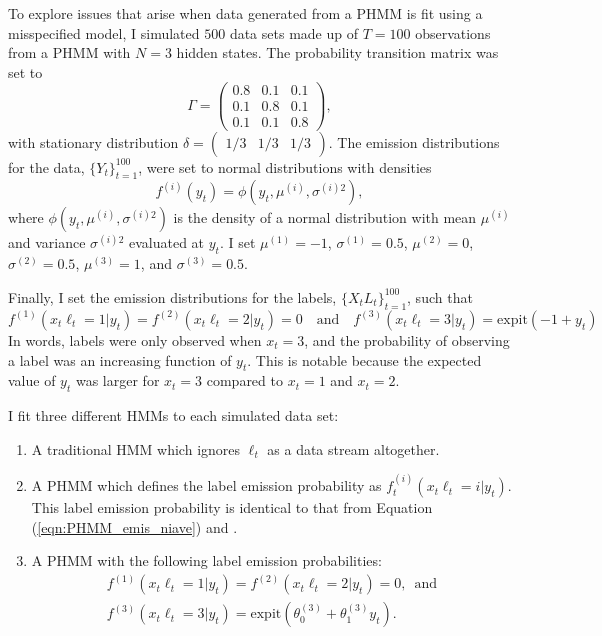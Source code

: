 To explore issues that arise when data generated from a PHMM is fit using a misspecified model, I simulated $500$ data sets made up of $T = 100$ observations from a PHMM with $N = 3$ hidden states. The probability transition matrix was set to 
%
\begin{equation*}
   \Gamma = \begin{pmatrix} 
                0.8 & 0.1 & 0.1 \\
                0.1 & 0.8 & 0.1 \\
                0.1 & 0.1 & 0.8 
            \end{pmatrix}, 
\end{equation*}
%
with stationary distribution $\delta = \begin{pmatrix} 1/3 & 1/3 & 1/3 \end{pmatrix}$. 
%
The emission distributions for the data, $\{Y_t\}_{t=1}^{100}$, were set to normal distributions with densities
\begin{equation*}
    f^{(i)}(y_t) = \phi(y_t,\mu^{(i)},\sigma^{(i)2}),
\end{equation*}
where $\phi(y_t,\mu^{(i)},\sigma^{(i)2})$ is the density of a normal distribution with mean $\mu^{(i)}$ and variance $\sigma^{(i)2}$ evaluated at $y_t$. I set $\mu^{(1)} = -1$, $\sigma^{(1)} = 0.5$, $\mu^{(2)} = 0$, $\sigma^{(2)}=0.5$, $\mu^{(3)} = 1$, and $\sigma^{(3)} = 0.5$.

Finally, I set the emission distributions for the labels, $\{X_t L_t\}_{t=1}^{100}$, such that
\begin{equation*}
    f^{(1)}(x_t \ell_t = 1|y_t) = f^{(2)}(x_t \ell_t = 2|y_t) = 0 \quad \text{and} \quad f^{(3)}(x_t \ell_t = 3|y_t) = \text{expit}(-1+y_t)
\end{equation*}
In words, labels were only observed when $x_t = 3$, and the probability of observing a label was an increasing function of $y_t$. This is notable because the expected value of $y_t$ was larger for $x_t = 3$ compared to $x_t = 1$ and $x_t = 2$.

I fit three different HMMs to each simulated data set: 
%
\begin{enumerate}
    \item A traditional HMM which ignores $\ell_t$ as a data stream altogether.
    \item A PHMM which defines the label emission probability as $f_t^{(i)}(x_t \ell_t = i|y_t)$. This label emission probability is identical to that from Equation (\ref{eqn:PHMM_emis_niave}) and \cite{McClintock:2018}.
    \item A PHMM with the following label emission probabilities:
    \begin{gather}
        f^{(1)}(x_t \ell_t = 1|y_t) = f^{(2)}(x_t \ell_t = 2|y_t) = 0, \enspace \text{and} \nonumber \\
        f^{(3)}(x_t \ell_t = 3|y_t) = \text{expit}(\theta^{(3)}_0+\theta^{(3)}_1 y_t).
        \label{eqn:PHMM_emis_ss}
    \end{gather}
\end{enumerate}

